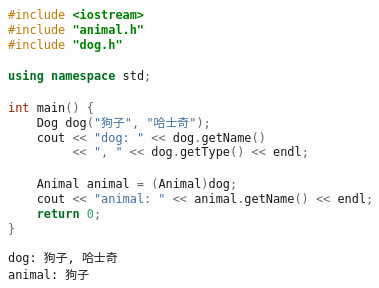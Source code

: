 \begin{lstlisting}[language=C++, title=test\_dog.cpp]
#include <iostream>
#include "animal.h"
#include "dog.h"

using namespace std;

int main() {
    Dog dog("狗子", "哈士奇");
    cout << "dog: " << dog.getName()
         << ", " << dog.getType() << endl; 

    Animal animal = (Animal)dog;
    cout << "animal: " << animal.getName() << endl;
    return 0;
}
\end{lstlisting}

\begin{tcolorbox}
	\begin{verbatim}
dog: 狗子, 哈士奇
animal: 狗子
    \end{verbatim}
\end{tcolorbox}

\newpage